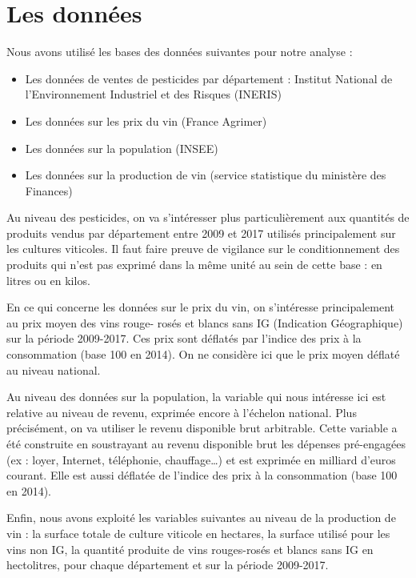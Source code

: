 \documentclass[11pt, a4paper]{article}
\begin{document}
\section*{Les données}
Nous avons utilisé les bases des données suivantes pour notre analyse :
\begin{itemize}
    \item Les données de ventes de pesticides par département : Institut National de l’Environnement Industriel et des Risques (INERIS)
    \item Les données sur les prix du vin (France Agrimer)
    \item Les données sur la population (INSEE)
    \item Les données sur la production de vin (service statistique du ministère des Finances)
\end{itemize}
\par
Au niveau des pesticides, on va s’intéresser plus particulièrement aux quantités de produits vendus par département entre 2009 et 2017 utilisés principalement sur les cultures viticoles. 
Il faut faire preuve de vigilance sur le conditionnement des produits qui n’est pas exprimé dans la même unité au sein de cette base : en litres ou en kilos.
\par
En ce qui concerne les données sur le prix du vin, on s’intéresse principalement au prix moyen des vins rouge- rosés et blancs sans IG (Indication Géographique) sur la période 2009-2017. 
Ces prix sont déflatés par l’indice des prix à la consommation (base 100 en 2014). 
On ne considère ici que le prix moyen déflaté au niveau national.
\par
Au niveau des données sur la population, la variable qui nous intéresse ici est relative au niveau de revenu, exprimée encore à l’échelon national. 
Plus précisément, on va utiliser le revenu disponible brut arbitrable. 
Cette variable a été construite en soustrayant au revenu disponible brut les dépenses pré-engagées (ex : loyer, Internet, téléphonie, chauffage…) et est exprimée en milliard d’euros courant. 
Elle est aussi déflatée de l’indice des prix à la consommation (base 100 en 2014).
\par
Enfin, nous avons exploité les variables suivantes au niveau de la production de vin : la surface totale de culture viticole en hectares, la surface utilisé pour les vins non IG, la quantité produite de vins rouges-rosés et blancs sans IG en hectolitres, pour chaque département et sur la période 2009-2017.
\end{document}
